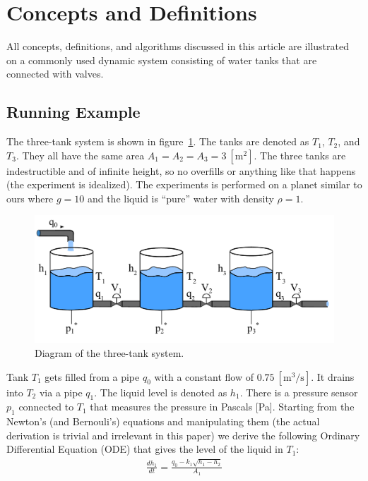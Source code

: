 \section{Concepts and Definitions}\label{sec:concepts}
%
All concepts, definitions, and algorithms discussed in this article
are illustrated on a commonly used dynamic system consisting of water
tanks that are connected with valves.
%
\subsection{Running Example}
%
The three-tank system is shown in figure~\ref{fig:three_tanks}. The
tanks are denoted as $T_1$, $T_2$, and $T_3$. They all have the
same area $A_1 = A_2 = A_3 = 3~[\textrm{m}^2]$. The three tanks are
indestructible and of infinite height, so no overfills or anything
like that happens (the experiment is idealized). The experiments is
performed on a planet similar to ours where $g = 10$ and the liquid is
``pure'' water with density $\rho = 1$.
%
\begin{figure}[htb]
  \centering
  \includegraphics[width=1\columnwidth]{3-tanks}
  \caption{Diagram of the three-tank system.}
  \label{fig:three_tanks}
\end{figure}
\par\noindent
%
Tank $T_1$ gets filled from a pipe $q_0$ with a constant flow of
$0.75~[\textrm{m}^3/\textrm{s}]$. It drains into $T_2$ via a pipe
$q_1$. The liquid level is denoted as $h_1$. There is a pressure
sensor $p_1$ connected to $T_1$ that measures the pressure in Pascals
[Pa]. Starting from the Newton's (and Bernouli's) equations and
manipulating them (the actual derivation is trivial and irrelevant in
this paper) we derive the following Ordinary Differential Equation
(ODE) that gives the level of the liquid in $T_1$:
%
\begin{eqnarray}
%
\frac{d h_1}{dt} = \frac{q_0 - k_1 \sqrt{h_1 - h_2}}{A_1}\label{eq:ode1}
%
\end{eqnarray}
